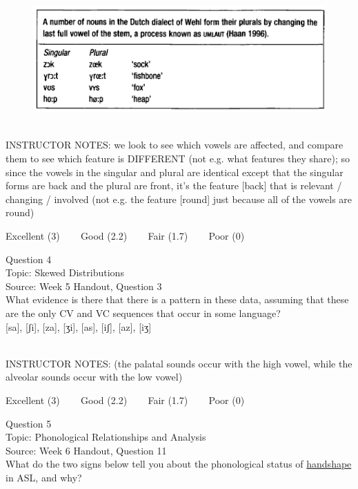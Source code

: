 \documentclass[12pt]{article}
\begin{document}
\begin{figure}[H]
\includegraphics{../images/dutch.png}
\end{figure}

~\\
INSTRUCTOR NOTES: we look to see which vowels are affected, and compare them to see which feature is DIFFERENT (not e.g. what features they share); so since the vowels in the singular and plural are identical except that the singular forms are back and the plural are front, it's the feature [back] that is relevant / changing / involved (not e.g. the feature [round] just because all of the vowels are round)


\vfill
Excellent (3) ~~~ Good (2.2) ~~~ Fair (1.7) ~~~ Poor (0)
\newpage

{\large Question 4}\\

Topic: Skewed Distributions\\
Source: Week 5 Handout, Question 3\\

What evidence is there that there is a pattern in these data, assuming that these are the only CV and VC sequences that occur in some language?\\

{[sa]}, {[ʃi]}, {[za]}, {[ʒi]}, {[as]}, {[iʃ]}, {[az]}, {[iʒ]}


~\\
INSTRUCTOR NOTES: (the palatal sounds occur with the high vowel, while the alveolar sounds occur with the low vowel)


\vfill
Excellent (3) ~~~ Good (2.2) ~~~ Fair (1.7) ~~~ Poor (0)
\newpage

{\large Question 5}\\

Topic: Phonological Relationships and Analysis\\
Source: Week 6 Handout, Question 11\\

What do the two signs below tell you about the phonological status of \underline{handshape} in ASL, and why?\\
\end{document}
